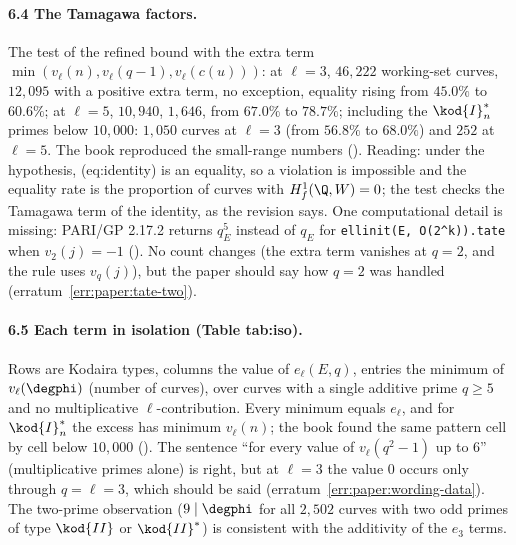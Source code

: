 \begin{sloppypar}
\paragraph{6.4 The Tamagawa factors.} The test of the refined bound with the extra term $\min(v_\ell(n),v_\ell(q-1),v_\ell(c(u)))$: at $\ell=3$, $46{,}222$ working-set curves, $12{,}095$ with a positive
extra term, no exception, equality rising from $45.0\%$ to $60.6\%$; at $\ell=5$, $10{,}940$, $1{,}646$, from $67.0\%$ to $78.7\%$; including the $\kod{I}_n^*$ primes below $10{,}000$: $1{,}050$ curves at $\ell=3$
(from $56.8\%$ to $68.0\%$) and $252$ at $\ell=5$. The book reproduced the small-range numbers (). Reading: under the hypothesis, (eq:identity) is an equality,
so a violation is impossible and the equality rate is the proportion of curves with $H^1_f(\Q,W)=0$; the test checks the Tamagawa term of the identity, as the revision says. One
computational detail is missing: PARI/GP 2.17.2 returns $q_E^5$ instead of $q_E$ for \texttt{ellinit(E, O(2\^{}k)).tate} when $v_2(j)=-1$ (). No count
changes (the extra term vanishes at $q=2$, and the rule uses $v_q(j)$), but the paper should say how $q=2$ was handled (erratum~\ref{err:paper:tate-two}).

\paragraph{6.5 Each term in isolation (Table tab:iso).} Rows are Kodaira types, columns the value of $e_\ell(E,q)$, entries the minimum of $v_\ell(\degphi)$ (number of curves), over curves with a
single additive prime $q\ge5$ and no multiplicative $\ell$-contribution. Every minimum equals $e_\ell$, and for $\kod{I}_n^*$ the excess has minimum $v_\ell(n)$; the book found the same pattern cell
by cell below $10{,}000$ (). The sentence ``for every value of $v_\ell(q^2-1)$ up to $6$'' (multiplicative primes alone) is right, but at $\ell=3$ the value $0$ occurs only
through $q=\ell=3$, which should be said (erratum~\ref{err:paper:wording-data}). The two-prime observation ($9\mid\degphi$ for all $2{,}502$ curves with two odd primes of type $\kod{II}$ or $\kod{II}^*$) is
consistent with the additivity of the $e_3$ terms.


\end{sloppypar}
